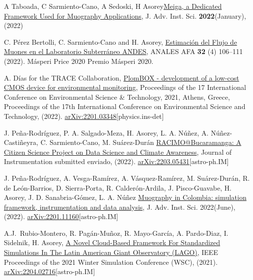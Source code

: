 \begin{etaremune}
\item {} A Taboada, C Sarmiento-Cano, A Sedoski, H Asorey\href{https://doi.org/10.31526/jais.2022.266}{Meiga, a Dedicated Framework Used for Muography Applications},  J. Adv. Inst. Sci. {\textbf{2022}}(January), (2022) %

\item {} C. Pérez Bertolli, C. Sarmiento-Cano and H. Asorey, \href{https://afan.df.uba.ar/journal/index.php/analesafa/article/view/2300}{Estimación del Flujo de Muones en el Laboratorio Subterráneo ANDES}, ANALES AFA {\textbf{32}} (4) 106--111 (2022). \ifeng Másperi Price 2020 \else Premio Másperi 2020\fi.

\item {} A. Días for the TRACE Collaboration, \href{}{PlomBOX - development of a low-cost CMOS device for environmental monitoring}, \en Proceedings of the 17 International Conference on Environmental Science \& Technology, 2021, Athens, Greece, \in Proceedings of the 17th International Conference on Environmental Science and Technology, (2022). \href{http://arxiv.org/abs/2201.03348}{arXiv:2201.03348}[physics.ins-det]

\item {} J. Peña-Rodríguez, P. A. Salgado-Meza, H. Asorey, L. A. Núñez, A. Núñez-Castiñeyra, C. Sarmiento-Cano, M. Suárez-Durán \href{}{RACIMO@Bucaramanga: A Citizen Science Project on Data Science and Climate Awareness}, Journal of Instrumentation \ifeng submitted \else enviado\fi, (2022). \href{http://arxiv.org/abs/2203.05431}{arXiv:2203.05431}[astro-ph.IM]

\item {} J. Peña-Rodríguez, A. Vesga-Ramírez, A. Vásquez-Ramírez, M. Suárez-Durán, R. de León-Barrios, D. Sierra-Porta, R. Calderón-Ardila, J. Pisco-Guavabe, H. Asorey, J. D. Sanabria-Gómez, L. A. Núñez \href{https://doi.org/10.31526/jais.2022.271}{Muography in Colombia: simulation framework, instrumentation and data analysis}, J. Adv. Inst. Sci. 2022(June), (2022). \href{ http://arxiv.org/abs/2201.11160}{arXiv:2201.11160}[astro-ph.IM]

\item {} A.J.\ Rubio-Montero, R. Pagán-Muñoz, R. Mayo-García, A. Pardo-Diaz, I. Sidelnik, H. Asorey, \href{https://doi.org/10.1109/WSC52266.2021.9715360}{A Novel Cloud-Based Framework For Standardized Simulations In The Latin American Giant Observatory (LAGO)}, \en IEEE Proceedings of the 2021 Winter Simulation Conference (WSC), (2021). \href{http://arxiv.org/abs/2204.02716}{arXiv:2204.02716}[astro-ph.IM]


\end{etaremune}
